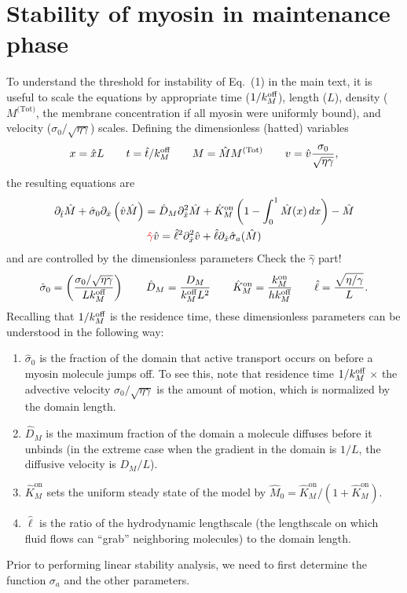 \documentclass[11pt]{article}
\newcommand{\red}[1]{\color{red}#1\normalcolor}
\newcommand{\6}[1]{#1_{\text{6}}}
\newcommand{\3}[1]{#1_{\text{3}}}
\newcommand{\Tot}[1]{#1^\text{(Tot)}}
\newcommand{\My}[1]{#1_M}
\begin{document}
\section{Stability of myosin in maintenance phase \label{sec:myosin}}
To understand the threshold for instability of Eq.\ (1) in the main text, it is useful to scale the equations by appropriate time ($1/\My{\koff}$), length ($L$), density ($\Tot{M}$, the membrane concentration if all myosin were uniformly bound), and velocity ($\sigma_0/\sqrt{\eta \gamma}$) scales. Defining the dimensionless (hatted) variables
\begin{equation}
\label{eq:NDD}
x = \hat{x} L \qquad t= \hat{t}/\My{\koff} \qquad M= \hat{M}\Tot{M} \qquad v = \hat{v} \frac{\sigma_0}{\sqrt{\eta \gamma}},
\end{equation}
the resulting equations are 
\begin{subequations}
\label{eq:MyosinEqs}
\begin{gather}
\label{eq:MND}
\Dthat \hat{M} +\hat{\sigma}_0  \Dxhat \left(\hat{v} \hat{M} \right) =\hat{D}_M \Dxhat^2 \hat{M} +\hat{K}^\text{on}_M \left(1-\int_0^1  \hat{M}(x) \, dx\right) - \hat{M}\\
\label{eq:MVND}
\red{\hat \gamma} \hat{v} = \hat{\ell}^2 \Dxhat^2 \hat v +\hat{\ell} \Dxhat \hat{\sigma}_a(\hat{M})
 \end{gather}
\end{subequations}
and are controlled by the dimensionless parameters \red{Check the $\hat \gamma$ part!}
\begin{equation}
\label{eq:NDparams}
\hat{\sigma}_0 = \left(\frac{\sigma_0/ \sqrt{\eta \gamma} }{L \My{\koff}}\right)   \qquad \hat{D}_M =\frac{D_M}{\My{\koff}  L^2} \qquad \hat{K}^\text{on}_M= \frac{\My{\kon}}{h \My{\koff}} \qquad \hat{\ell} = \frac{\sqrt{\eta/\gamma}}{L}.
\end{equation}
Recalling that $1/\My{\koff}$ is the residence time, these dimensionless parameters can be understood in the following way: 
\begin{enumerate}
\item $\hat{\sigma}_0$ is the fraction of the domain that active transport occurs on before a myosin molecule jumps off. To see this, note that residence time $1/\My{\koff}$ $\times$ the advective velocity $\sigma_0 / \sqrt{\eta \gamma}$ is the amount of motion, which is normalized by the domain length.
\item $\hat{D}_M$ is the maximum fraction of the domain a molecule diffuses before it unbinds (in the extreme case when the gradient in the domain is $1/L$, the diffusive velocity is $D_M/L$). 
\item $\hat{K}^\text{on}_M$ sets the uniform steady state of the model by $\hat{M}_0= \hat{K}^\text{on}_M/\left(1+\hat{K}^\text{on}_M\right)$.
\item $\hat{\ell}$ is the ratio of the hydrodynamic lengthscale (the lengthscale on which fluid flows can ``grab'' neighboring molecules) to the domain length.
\end{enumerate}
Prior to performing linear stability analysis, we need to first determine the function $\sigma_a$ and the other parameters. 
\end{document}
